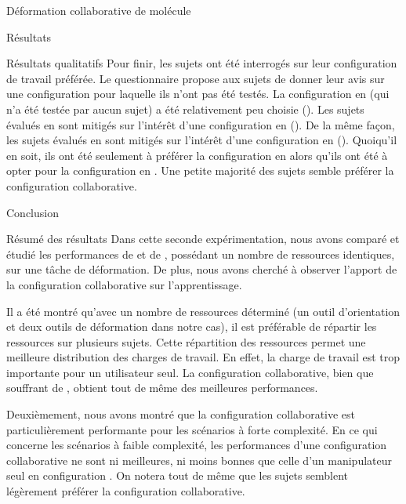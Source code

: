 \documentclass[myfrancais,ngerman,english,french]{mythesis}
\begin{document}
\begin{mychapter}{Déformation collaborative de molécule}
\begin{mysection}{Résultats}
\begin{mysubsection}{Résultats qualitatifs}
				Pour finir, les sujets ont été interrogés sur leur configuration de travail préférée.
				Le questionnaire propose aux sujets de donner leur avis sur une configuration pour laquelle ils n'ont pas été testés.
				La configuration  en  (qui n'a été testée par aucun sujet) a été relativement peu choisie ().
				Les sujets évalués en  sont mitigés sur l'intérêt d'une configuration  en  ().
				De la même façon, les sujets évalués en  sont mitigés sur l'intérêt d'une configuration  en  ().
				Quoiqu'il en soit, ils ont été seulement  à préférer la configuration  en  alors qu'ils ont été  à opter pour la configuration  en .
				Une petite majorité des sujets semble préférer la configuration collaborative.
			\end{mysubsection}
		\end{mysection}
		\begin{mysection}{Conclusion}
			\begin{mysubsection}{Résumé des résultats}
				Dans cette seconde expérimentation, nous avons comparé et étudié les performances de  et de , possédant un nombre de ressources identiques, sur une tâche de déformation.
				De plus, nous avons cherché à observer l'apport de la configuration collaborative sur l'apprentissage.

				Il a été montré qu'avec un nombre de ressources déterminé (un outil d'orientation et deux outils de déformation dans notre cas), il est préférable de répartir les ressources sur plusieurs sujets.
				Cette répartition des ressources permet une meilleure distribution des charges de travail.
				En effet, la charge de travail est trop importante pour un utilisateur seul.
				La configuration collaborative, bien que souffrant de , obtient tout de même des meilleures performances.

				Deuxièmement, nous avons montré que la configuration collaborative est particulièrement performante pour les scénarios à forte complexité.
				En ce qui concerne les scénarios à faible complexité, les performances d'une configuration collaborative ne sont ni meilleures, ni moins bonnes que celle d'un manipulateur seul en configuration .
				On notera tout de même que les sujets semblent légèrement préférer la configuration collaborative.


\end{mysubsection}
\end{mysection}
\end{mychapter}
\end{document}
